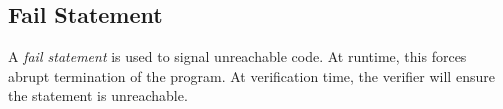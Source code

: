 %
%
%
% 
%
%


\subsection{Fail Statement}
\label{c_stmts_fail}
A {\em fail statement} is used to signal unreachable code.  At runtime, this forces abrupt termination of the program.  At verification time, the verifier will ensure the statement is unreachable.

